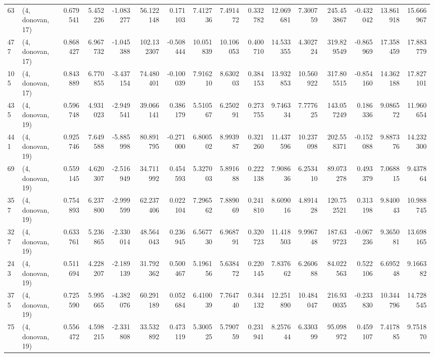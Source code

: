 \begin{tabular}{llrrrrrrrrrrrrrr}
63  &  (4, donovan, 17) &   0.679541 &   5.452226 &  -1.083277 &    56.122148 &   0.171103 &   7.412736 &   7.491472 &  0.332782 &  12.069681 &   7.300759 &   245.453867 &  -0.432042 &  13.861918 &  15.666967 \\
477 &  (4, donovan, 17) &   0.868427 &   6.967732 &  -1.045388 &   102.132307 &  -0.508444 &  10.051839 &  10.106053 &  0.400710 &  14.533355 &   4.302724 &   319.829549 &  -0.865969 &  17.358459 &  17.883779 \\
105 &  (4, donovan, 17) &   0.843889 &   6.770855 &  -3.437154 &    74.480401 &  -0.100039 &   7.916210 &   8.630203 &  0.384153 &  13.932853 &  10.560922 &   317.805515 &  -0.854160 &  14.362188 &  17.827101 \\
435 &  (4, donovan, 19) &   0.596748 &   4.931023 &  -2.949541 &    39.066141 &   0.386179 &   5.510567 &   6.250291 &  0.273755 &   9.746334 &   7.777625 &   143.057249 &   0.186336 &   9.086572 &  11.960654 \\
441 &  (4, donovan, 19) &   0.925746 &   7.649588 &  -5.885998 &    80.891795 &  -0.271000 &   6.800502 &   8.993987 &  0.321260 &  11.437596 &  10.237098 &   202.558371 &  -0.152088 &   9.887376 &  14.232300 \\
69  &  (4, donovan, 19) &   0.559145 &   4.620307 &  -2.516949 &    34.711992 &   0.454593 &   5.327003 &   5.891688 &  0.222138 &   7.908636 &   6.253410 &    89.073278 &   0.493379 &   7.068815 &   9.437864 \\
357 &  (4, donovan, 19) &   0.754893 &   6.237800 &  -2.999599 &    62.237406 &   0.022104 &   7.296562 &   7.889069 &  0.241810 &   8.609016 &   4.891428 &   120.752521 &   0.313198 &   9.840043 &  10.988745 \\
327 &  (4, donovan, 19) &   0.633761 &   5.236865 &  -2.330014 &    48.564043 &   0.236945 &   6.567730 &   6.968791 &  0.320723 &  11.418503 &   9.996748 &   187.639723 &  -0.067236 &   9.365081 &  13.698165 \\
243 &  (4, donovan, 19) &   0.511694 &   4.228207 &  -2.189139 &    31.792362 &   0.500467 &   5.196156 &   5.638472 &  0.220145 &   7.837662 &   6.260688 &    84.022563 &   0.522106 &   6.695248 &   9.166382 \\
375 &  (4, donovan, 19) &   0.725590 &   5.995665 &  -4.382076 &    60.291189 &   0.052684 &   6.410039 &   7.764740 &  0.344132 &  12.251890 &  10.484047 &   216.930035 &  -0.233830 &  10.344796 &  14.728545 \\
75  &  (4, donovan, 19) &   0.556472 &   4.598215 &  -2.331808 &    33.532892 &   0.473119 &   5.300525 &   5.790759 &  0.231941 &   8.257644 &   6.330399 &    95.098972 &   0.459107 &   7.417885 &   9.751870 \\

\end{tabular}
